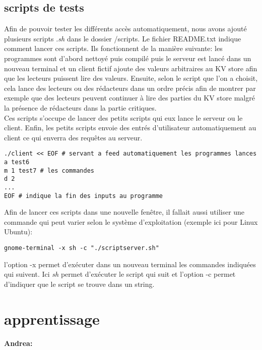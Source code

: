 \documentclass[11pt,a4paper]{article}
\begin{document}
\subsection{scripts de tests}
Afin de pouvoir tester les différents accès automatiquement, nous avons ajouté plusieurs scripts \textit{.sh} dans le dossier /scripts. Le fichier README.txt indique comment lancer ces scripts. Ils fonctionnent de la manière suivante: les programmes sont d'abord nettoyé puis compilé puis le serveur est lancé dans un nouveau terminal et un client fictif ajoute des valeurs arbitraires au KV store afin que les lecteurs puissent lire des valeurs. Ensuite, selon le script que l'on a choisit, cela lance des lecteurs ou des rédacteurs dans un ordre précis afin de montrer par exemple que des lecteurs peuvent continuer à lire des parties du KV store malgré la présence de rédacteurs dans la partie critiques. \\
Ces scripts s'occupe de lancer des petits scripts qui eux lance le serveur ou le client. Enfin, les petits scripts envoie des entrés d'utilisateur automatiquement au client ce qui enverra des requêtes au serveur. 
\begin{lstlisting}
./client << EOF # servant a feed automatiquement les programmes lances
a test6
m 1 test7 # les commandes 
d 2
...
EOF # indique la fin des inputs au programme
\end{lstlisting}
Afin de lancer ces scripts dans une nouvelle fenêtre, il fallait aussi utiliser une commande qui peut varier selon le système d'exploitation (exemple ici pour Linux Ubuntu):
\begin{lstlisting}
gnome-terminal -x sh -c "./scriptserver.sh" 
\end{lstlisting}
l'option -x permet d'exécuter dans un nouveau terminal les commandes indiquées qui suivent. Ici \textit{sh} permet d'exécuter le script qui suit et l'option -c permet d'indiquer que le script se trouve dans un string.

\section{apprentissage}
\textbf{Andrea:}\\
\end{document}
